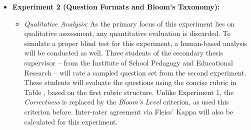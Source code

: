 \begin{itemize}
    \vspace{0em}

    \item \textbf{Experiment 2 (Question Formats and Bloom's Taxonomy):}
    \begin{itemize}
        \item \textit{Qualitative Analysis:} As the primary focus of this experiment lies on qualitative assessment, any quantitative evaluation is discarded. To simulate a proper blind test for this experiment, a human-based analysis will be conducted as well. Three students of the secondary thesis supervisor -- from the Institute of School Pedagogy and Educational Research -- will rate a sampled question set from the second experiment. These students will evaluate the questions using the concise rubric in Table , based on the first rubric structure. Unlike Experiment 1, the \textit{Correctness} is replaced by the \textit{Bloom's Level} criterion, as \cite{mi_comparative_2024} used this criterion before. Inter-rater agreement via Fleiss' Kappa will also be calculated for this experiment.
        

\end{itemize}
\end{itemize}
